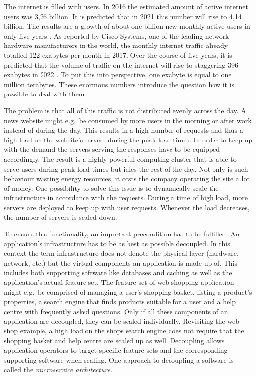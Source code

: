 
The internet is filled with users. In 2016 the estimated amount of active
internet users was 3,26 billion. It is predicted that in 2021 this number will
rise to 4,14 billion. The results are a growth of about one billion new monthly
active users in only five years
\autocite{eMarketerAnzahlderInternetnutzer2017}. As reported by Cisco Systems,
one of the leading network hardware manufacturers in the world, the monthly
internet traffic already totalled 122 exabytes per month in 2017. Over the
course of five years, it is predicted that the volume of traffic on the
internet will rise to staggering 396 exabytes in 2022
\autocite{SystemsDatenvolumendesglobalen2018}. To put this into perspective,
one exabyte is equal to one million terabytes. These enormous numbers introduce
the question how it is possible to deal with them.

The problem is that all of this traffic is not distributed evenly across the
day. A news website might e.g.\ be consumed by more users in the morning or
after work instead of during the day. This results in a high number of requests
and thus a high load on the website's servers during the peak load times. In
order to keep up with the demand the servers serving the responses have to be
equipped accordingly. The result is a highly powerful computing cluster that is
able to serve users during peak load times but idles the rest of the day. Not
only is such behaviour wasting energy resources, it costs the company operating
the site a lot of money. One possibility to solve this issue is to dynamically
scale the infrastructure in accordance with the requests.  During a time of
high load, more servers are deployed to keep up with user requests. Whenever
the load decreases, the number of servers is scaled down.

To ensure this functionality, an important precondition has to be fulfilled: An
application's infrastructure has to be as best as possible decoupled. In this
context the term infrastructure does not denote the physical layer (hardware,
network, etc.) but the virtual components an application is made up of. This
includes both supporting software like databases and caching as well as the
application's actual feature set. The feature set of web shopping application
might e.g.\ be comprised of managing a user's shopping basket, listing a
product's properties, a search engine that finds products suitable for a user
and a help centre with frequently asked questions. Only if all these components
of an application are decoupled, they can be scaled individually. Revisiting
the web shop example, a high load on the shops search engine does not require
that the shopping basket and help centre are scaled up as well. Decoupling
allows application operators to target specific feature sets and the
corresponding supporting software when scaling. One approach to decoupling a
software is called the \textit{microservice architecture}.

